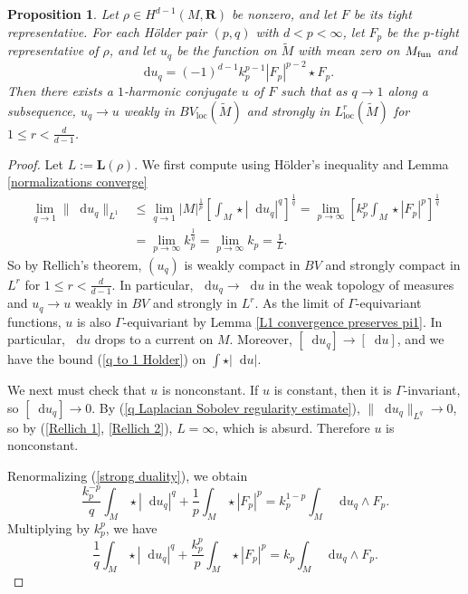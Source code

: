 \documentclass[reqno,11pt]{amsart}
\newcommand{\RR}{\mathbf{R}}
\newcommand*\dif{\mathop{}\!\mathrm{d}}
\newcommand{\Comass}{\mathbf L}
\newcommand{\loc}{\mathrm{loc}}
\newtheorem{proposition}[theorem]{Proposition}
\theoremstyle{definition}
\numberwithin{equation}{section}
\begin{document}
\begin{proposition}\label{existence 1}
Let $\rho \in H^{d - 1}(M, \RR)$ be nonzero, and let $F$ be its tight representative.
For each H\"older pair $(p, q)$ with $d < p < \infty$, let $F_p$ be the $p$-tight representative of $\rho$, and let $u_q$ be the function on $\tilde M$ with mean zero on $M_{\rm fun}$ and
$$\dif u_q = (-1)^{d - 1} k_p^{p - 1} |F_p|^{p - 2} \star F_p.$$
Then there exists a $1$-harmonic conjugate $u$ of $F$ such that as $q \to 1$ along a subsequence, $u_q \to u$ weakly in $BV_\loc(\tilde M)$ and strongly in $L^r_\loc(\tilde M)$ for $1 \leq r < \frac{d}{d - 1}$.
\end{proposition}
\begin{proof}
Let $L := \Comass(\rho)$.
We first compute using H\"older's inequality and Lemma \ref{normalizations converge}
\begin{align}
\lim_{q \to 1} \|\dif u_q\|_{L^1}
&\leq \lim_{q \to 1} |M|^{\frac{1}{p}} \left[\int_M \star |\dif u_q|^q\right]^{\frac{1}{q}} = \lim_{p \to \infty} \left[k_p^p \int_M \star |F_p|^p\right]^{\frac{1}{q}} \label{Rellich 1}\\
&= \lim_{p \to \infty} k_p^{\frac{1}{q}} = \lim_{p \to \infty} k_p = \frac{1}{L} \label{Rellich 2}.
\end{align}
So by Rellich's theorem, $(u_q)$ is weakly compact in $BV$ and strongly compact in $L^r$ for $1 \leq r < \frac{d}{d - 1}$.
In particular, $\dif u_q \to \dif u$ in the weak topology of measures and $u_q \to u$ weakly in $BV$ and strongly in $L^r$.
As the limit of $\Gamma$-equivariant functions, $u$ is also $\Gamma$-equivariant by Lemma \ref{L1 convergence preserves pi1}.
In particular, $\dif u$ drops to a current on $M$.
Moreover, $[\dif u_q] \to [\dif u]$, and we have the bound (\ref{q to 1 Holder}) on $\int \star |\dif u|$.

We next must check that $u$ is nonconstant.
If $u$ is constant, then it is $\Gamma$-invariant, so $[\dif u_q] \to 0$.
By (\ref{q Laplacian Sobolev regularity estimate}), $\|\dif u_q\|_{L^q} \to 0$, so by (\ref{Rellich 1}, \ref{Rellich 2}), $L = \infty$, which is absurd.
Therefore $u$ is nonconstant.

Renormalizing (\ref{strong duality}), we obtain 
$$\frac{k_p^{-p}}{q} \int_M \star |\dif u_q|^q + \frac{1}{p} \int_M \star |F_p|^p = k_p^{1 - p} \int_M \dif u_q \wedge F_p.$$
Multiplying by $k_p^p$, we have 
\begin{equation}\label{1 strong duality before limits}
	\frac{1}{q} \int_M \star |\dif u_q|^q + \frac{k_p^p}{p} \int_M \star |F_p|^p = k_p \int_M \dif u_q \wedge F_p.
\end{equation}


\end{proof}
\end{document}
